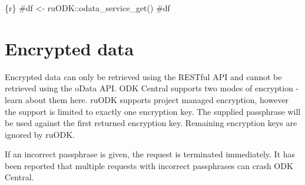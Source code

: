 \documentclass[
  letterpaper,
  DIV=11,
  numbers=noendperiod,
  oneside]{scrreprt}
\newenvironment{Shaded}{\begin{snugshade}}{\end{snugshade}}
\newcommand{\CommentTok}[1]{\textcolor[rgb]{0.37,0.37,0.37}{#1}}
\newcommand{\InformationTok}[1]{\textcolor[rgb]{0.37,0.37,0.37}{#1}}
\begin{document}
\begin{Shaded}
\begin{Highlighting}[]
\InformationTok{\textasciigrave{}\textasciigrave{}\textasciigrave{}\{r\}}
\CommentTok{\#df \textless{}{-} ruODK::odata\_service\_get()}
\CommentTok{\#df}
\InformationTok{\textasciigrave{}\textasciigrave{}\textasciigrave{}}
\end{Highlighting}
\end{Shaded}

\hypertarget{encrypted-data}{%
\section{Encrypted data}\label{encrypted-data}}

Encrypted data can only be retrieved using the RESTful API and cannot be
retrieved using the oData API. ODK Central supports two modes of
encryption - learn about them here. ruODK supports project managed
encryption, however the support is limited to exactly one encryption
key. The supplied passphrase will be used against the first returned
encryption key. Remaining encryption keys are ignored by ruODK.

\begin{tcolorbox}[enhanced jigsaw, coltitle=black, opacityback=0, title=\textcolor{quarto-callout-important-color}{\faExclamation}\hspace{0.5em}{Important}, toprule=.15mm, bottomtitle=1mm, colbacktitle=quarto-callout-important-color!10!white, colframe=quarto-callout-important-color-frame, left=2mm, opacitybacktitle=0.6, bottomrule=.15mm, arc=.35mm, toptitle=1mm, colback=white, titlerule=0mm, breakable, leftrule=.75mm, rightrule=.15mm]

If an incorrect passphrase is given, the request is terminated
immediately. It has been reported that multiple requests with incorrect
passphrases can crash ODK Central.

\end{tcolorbox}
\end{document}
